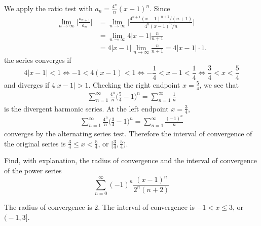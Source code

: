 \begin{solution}
We apply the ratio test with $a_n= \frac{4^n}{n}(x-1)^n$.
Since
\begin{align*}
\lim_{n\to\infty} \bigg| \frac{a_{n+1}}{a_n} \bigg|
&= \lim_{n\to\infty} \bigg| \frac{4^{n+1}(x-1)^{n+1}/(n+1)}{4^n(x-1)^n/n} \bigg| \\
&= \lim_{n\to\infty} 4|x-1| \frac{n}{n+1} \\
&= 4|x-1| \lim_{n\to\infty} \frac{n}{n+1} = 4|x-1|\cdot1.
\end{align*}
the series converges if
\begin{equation*}
4|x-1|<1
\iff -1<4(x-1)<1
\iff -\frac{1}{4}<x-1<\frac{1}{4}
\iff \frac{3}{4}<x<\frac{5}{4}
\end{equation*}
and diverges if $4|x-1|>1$.
Checking the right endpoint $x=\frac{5}{4}$, we see that
\begin{align*}
\sum_{n=1}^\infty \frac{4^n}{n}\bigg( \frac{5}{4}-1 \bigg)^n
= \sum_{n=1}^\infty \frac{1}{n}
\end{align*}
is the divergent harmonic series. At the left endpoint $x=\frac{3}{4}$,
\begin{align*}
\sum_{n=1}^\infty \frac{4^n}{n}\bigg( \frac34-1 \bigg)^n = \sum_{n=1}^\infty \frac{(-1)^n}{n}
\end{align*}
converges by the alternating series test. Therefore the interval of convergence of the
original series is $\frac{3}{4}\le x<\frac{5}{4}$, or $\big[\frac{3}{4},\frac{5}{4}\big)$.

\end{solution}


\begin{Mquestion}[2012A]
Find, with explanation, the radius of convergence and the interval of
convergence of the power series
\begin{equation*}
\sum_{n=0}^\infty (-1)^n\frac{(x-1)^n}{2^n(n+2)}
\end{equation*}
\end{Mquestion}


\begin{answer}
The radius of convergence is $2$.
The interval of convergence  is $-1< x\le3$,
or $\big(-1,3\big]$.
\end{answer}

